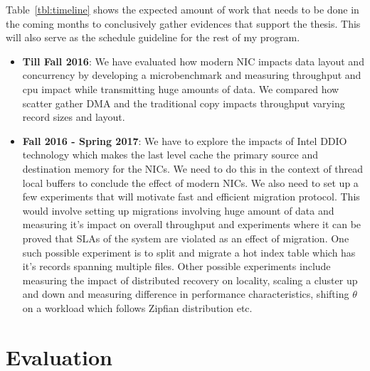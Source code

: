 Table~\ref{tbl:timeline} shows the expected amount of work that needs to be done 
in the coming months to conclusively gather evidences that support the thesis. 
This will also serve as the schedule guideline for the rest of my program.


\begin{itemize}
\item{\textbf{Till Fall 2016}:} We have evaluated how modern NIC impacts data layout 
and concurrency by developing a microbenchmark and measuring throughput and cpu 
impact while transmitting huge amounts of data. We compared how scatter gather DMA 
and the traditional copy impacts throughput varying record sizes and layout. 

\item{\textbf{Fall 2016 - Spring 2017}:} We have to explore the impacts of Intel\textregistered 
DDIO~\cite{ddio} technology which makes the last level cache the primary source and 
destination memory for the NICs. We need to do this in the context of thread local 
buffers to conclude the effect of modern NICs. We also need to set up a few experiments
that will motivate fast and efficient migration protocol. This would involve 
setting up migrations involving huge amount of data and measuring it's impact on overall throughput
and experiments where it can be proved that SLAs of the system are violated as an effect of migration.
One such possible experiment is to split and migrate a hot index table which has it's 
records spanning multiple files. Other possible experiments include measuring the 
impact of distributed recovery on locality, scaling a cluster up and down and measuring
difference in performance characteristics, shifting $\theta$ on a workload which follows 
Zipfian distribution etc.
\end{itemize}



\section{Evaluation}
